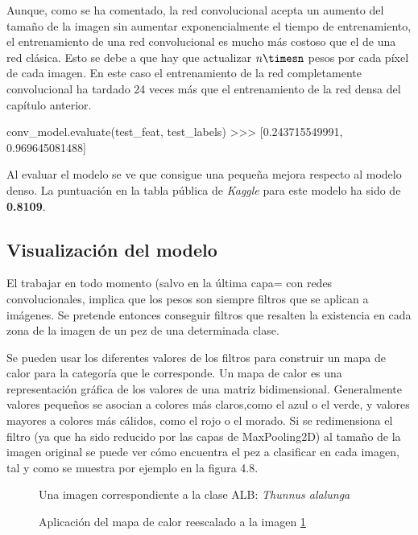 Aunque, como se ha comentado, la red convolucional acepta un aumento del tamaño de la imagen sin aumentar exponencialmente el tiempo de entrenamiento, el entrenamiento de una red convolucional es mucho más costoso que el de una red clásica. Esto se debe a que hay que actualizar $n\timesn$ pesos por cada píxel de cada imagen. En este caso el entrenamiento de la red completamente convolucional ha tardado 24 veces más que el entrenamiento de la red densa del capítulo anterior.

\begin{python}
conv_model.evaluate(test_feat, test_labels)
>>> [0.243715549991, 0.969645081488]
\end{python}

Al evaluar el modelo se ve que consigue una pequeña mejora respecto al modelo
denso. La puntuación en la tabla pública de \textit{Kaggle} para este modelo ha
sido de \textbf{0.8109}.


\subsection{Visualización del modelo}

El trabajar en todo momento (salvo en la última capa= con redes convolucionales, implica que los pesos son siempre filtros que se aplican a imágenes. Se pretende entonces conseguir filtros que resalten la existencia en cada zona de la imagen de un pez de una determinada clase.

Se pueden usar los diferentes valores de los filtros para construir un mapa de calor para la categoría que le corresponde. Un mapa de calor es una representación gráfica de los valores de una matriz bidimensional. Generalmente valores pequeños se asocian a colores más claros,como el azul o el verde, y valores mayores a colores más cálidos, como el rojo o el morado.  Si se redimensiona el filtro (ya que ha sido reducido por las capas de MaxPooling2D) al tamaño de la imagen original se puede ver cómo encuentra el pez a clasificar en cada imagen, tal y como se muestra por ejemplo en la figura 4.8.

\begin{figure}
    \caption{Una imagen correspondiente a la clase ALB: \textit{Thunnus alalunga}}
\label{fc-fish}
\end{figure}

\begin{figure}
    \caption{Aplicación del mapa de calor reescalado a la imagen \ref{fc-fish}}
\label{fc-heatmap}
\end{figure}

